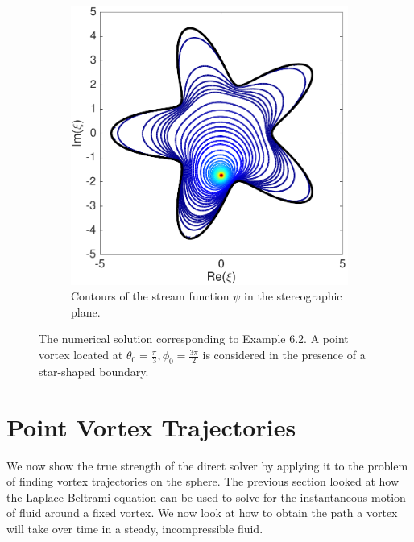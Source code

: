 \documentclass{sfuthesis}
\begin{document}
\begin{figure}[h]
\begin{subfigure}[b]{0.4\textwidth}
                	\includegraphics[width=\textwidth]{Ex6-2StarStreamFnStereo}
                	\caption{Contours of the stream function $\psi$ in the stereographic plane. }
       \end{subfigure}
         \caption{The numerical solution corresponding to Example 6.2. A point vortex located at $\theta_0=\frac{\pi}{3}, \phi_0=\frac{3\pi}{2}$ is considered in the presence of a star-shaped boundary. }
          \label{fig: Ex6-2StarInstantaneous}
\end{figure}

\clearpage 
\section{Point Vortex Trajectories}
We now show the true strength of the direct solver by applying it to the problem of finding vortex trajectories on the sphere. The previous section looked at how the Laplace-Beltrami equation can be used to solve for the instantaneous motion of fluid around a fixed vortex. We now look at how to obtain the path a vortex will take over time in a steady, incompressible fluid. 
\end{document}
